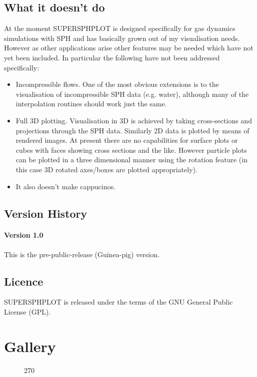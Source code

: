 \documentclass[a4paper,12pt]{article}
\begin{document}
\subsection{What it doesn't do}
At the moment SUPERSPHPLOT is designed specifically for gas dynamics
simulations with SPH and has basically grown out of my visualisation needs.
However as other applications arise other features may be needed which have not
yet been included. In particular the following have not been addressed
specifically:
\begin{itemize}
\item Incompressible flows.   One of the most obvious extensions is to the visualisation
of incompressible SPH data (e.g. water), although many of the interpolation routines should work just the same. 
\item Full 3D plotting. Visualisation in 3D is achieved by taking cross-sections
and projections through the SPH data. Similarly 2D data is plotted by means of
rendered images. At present there are no capabilities for surface plots or cubes
with faces showing cross sections and the like. However
particle plots can be plotted in a three dimensional manner using the rotation
feature (in this case 3D rotated axes/boxes are plotted appropriately).
\item It also doesn't make cappucinos.
\end{itemize}

\subsection{Version History}

\paragraph{Version 1.0}
 This is the pre-public-release (Guinea-pig) version.

\subsection{Licence}
 SUPERSPHPLOT is released under the terms of the GNU General Public License (GPL). 

\section{Gallery}

\begin{figure}
\begin{center}
\begin{turn}{270}\end{turn}
\label{fig:hyperbolic}
\end{center}
\end{figure}
\end{document}
